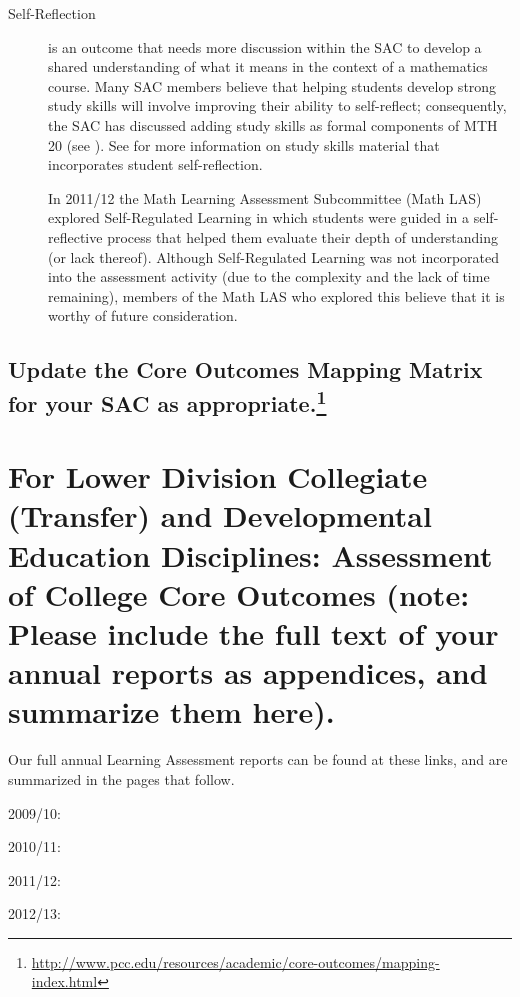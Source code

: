 \begin{description}
\item[Self-Reflection] is an outcome that needs more discussion within the SAC
  to develop a shared understanding of what it means in the context of a
  mathematics course.  Many SAC members believe that helping students develop
  strong study skills will involve improving their ability to self-reflect;
  consequently, the SAC has discussed adding study skills as formal components
  of MTH 20 (see ).  See 
  for more information on study skills material that incorporates student
  self-reflection. 

In 2011/12 the Math Learning Assessment Subcommittee (Math LAS) explored
Self-Regulated Learning in which students were guided in a self-reflective process
that helped them evaluate their depth of understanding (or lack thereof).
Although Self-Regulated Learning was not incorporated into the assessment
activity (due to the complexity and the lack of time remaining), members of the
Math LAS who explored this believe that it is worthy of future
consideration.

\end{description}

\subsection[Update the Core Outcomes Mapping Matrix for your SAC as
appropriate.]{Update the Core Outcomes Mapping Matrix for your SAC as
appropriate.\footnote{\url{http://www.pcc.edu/resources/academic/core-outcomes/mapping-index.html}}}


\section[Assessment of College Core Outcomes]{For Lower Division Collegiate
(Transfer) and Developmental Education Disciplines:  Assessment of College Core
Outcomes    (note:  Please include the full text of your annual reports as
appendices, and summarize them here).}\label{ass:sec:coreoutcomes}

Our full annual Learning Assessment reports can be found at these links, and 
are summarized in the pages that follow.
\begin{description}
  \item[2009/10:] \cite{annualLASreport2009}
  \item[2010/11:] \cite{annualLASreport2010}
  \item[2011/12:] \cite{annualLASreport2011}
  \item[2012/13:] \cite{annualLASreport2012}
\end{description}

